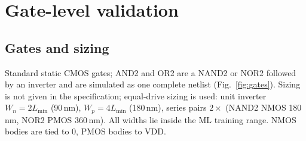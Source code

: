 \documentclass[11pt,a4paper]{article}
\begin{document}
\section{Gate-level validation}
\subsection{Gates and sizing}
Standard static CMOS gates; AND2 and OR2 are a NAND2 or NOR2 followed by an inverter and are simulated as one
complete netlist (Fig.~\ref{fig:gates}). Sizing is not given in the specification; equal-drive sizing is used:
unit inverter $W_n = 2L_\text{min}$ (90\,nm), $W_p = 4L_\text{min}$ (180\,nm), series pairs $2\times$ (NAND2 NMOS
180\,nm, NOR2 PMOS 360\,nm). All widths lie inside the ML training range. NMOS bodies are tied to 0, PMOS
bodies to VDD.
\end{document}
